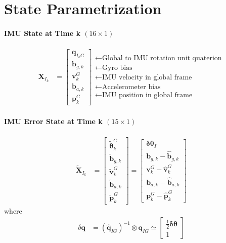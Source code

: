 \documentclass[10pt,letterpaper,fleqn,oneside]{article}
\newcommand{\nl}{\\[0.5em]}
\def\Vec#1{\mathbf{#1}} %
\newcommand{\bbm}{\begin{bmatrix}}
\newcommand{\ebm}{\end{bmatrix}}
\begin{document}
\renewcommand{\headrulewidth}{0pt}
\renewcommand{\footrulewidth}{0pt}



\newpage
{}
\setcounter{page}{1}





\newpage
{}
\setcounter{page}{1}


\section{State Parametrization}
\paragraph{IMU State at Time k $(16\times1)$}
\begin{align}
\Vec{X}_{I_k} &= \bbm \Vec{q}_{I_k G} \nl
						\Vec{b}_{g,k} \nl
						\Vec{v}^G_k \nl
						\Vec{b}_{a,k} \nl
						\Vec{p}^G_k 
				 \ebm 
				 \begin{array}{l}
					 \leftarrow \text{Global to IMU rotation unit quaterion} \nl
 					 \leftarrow \text{Gyro bias} \nl
					 \leftarrow \text{IMU velocity in global frame} \nl
					 \leftarrow \text{Accelerometer bias} \nl
					 \leftarrow \text{IMU position in global frame}
				 \end{array}						 
\end{align}

\paragraph{IMU Error State at Time k $(15\times1)$}
\begin{align}
\widetilde{\Vec{X}}_{I_k} &= 	\bbm \widetilde{\boldsymbol{\theta}}^G_k \nl
										\widetilde{\Vec{b}}_{g,k} \nl
										\widetilde{\Vec{v}}^G_k \nl
										\widetilde{\Vec{b}}_{a,k} \nl
										\widetilde{\Vec{p}}^G_k 
								\ebm
								=
								\bbm
										\boldsymbol{\delta\theta}_I \nl
										\Vec{b}_{g,k} - \hat{\Vec{b}}_{g,k} \nl
										\Vec{v}^G_k - \hat{\Vec{v}}^G_k \nl
										\Vec{b}_{a,k} - \hat{\Vec{b}}_{a,k} \nl
										\Vec{p}^G_k - \hat{\Vec{p}}^G_k 
								\ebm
\end{align}
where
\begin{align}
\delta\Vec{q} &= \left(\hat{\Vec{q}}_{I G}\right)^{-1} \otimes \Vec{q}_{I G} \simeq \bbm \frac{1}{2}\boldsymbol{\delta\theta} \nl 1 \ebm
\end{align}
\end{document}
